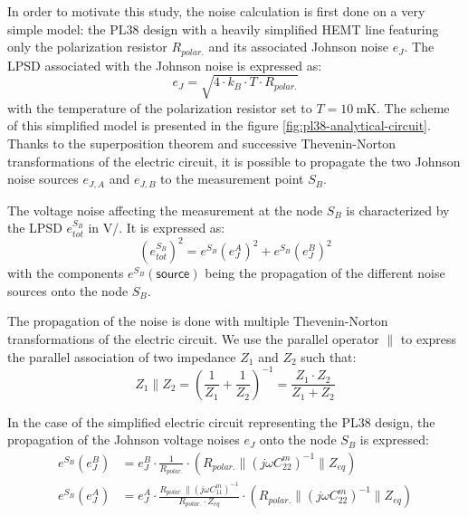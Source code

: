 In order to motivate this study, the noise calculation is first done on a very simple model: the PL38 design with a heavily simplified HEMT line featuring only the polarization resistor $R_{polar.}$ and its associated Johnson noise $e_J$. The LPSD associated with the Johnson noise is expressed as:
\begin{equation}
e_J = \sqrt{4 \cdot k_B \cdot T \cdot R_{polar.}}
\end{equation}
with the temperature of the polarization resistor set to $T=\SI{10}{\milli\kelvin}$. The scheme of this simplified model is presented in the figure \ref{fig:pl38-analytical-circuit}. Thanks to the superposition theorem and successive Thevenin-Norton transformations of the electric circuit, it is possible to propagate the two Johnson noise sources $e_{J,A}$ and $e_{J,B}$ to the measurement point $S_B$. 

The voltage noise affecting the measurement at the node $S_B$ is characterized by the LPSD $e_{tot}^{S_B}$ in \si[per-mode=symbol]{\volt\per\sqrthz}. It is expressed as:
\begin{equation}
\left( e_{tot}^{S_B} \right)^2
=
e^{S_B} \left( e_J^A \right)^2
+
e^{S_B} \left( e_J^B \right)^2
\end{equation}
with the components $e^{S_B} (\textsf{source})$ being the propagation of the different noise sources onto the node $S_B$.

The propagation of the noise is done with multiple Thevenin-Norton transformations of the electric circuit. We use the parallel operator $\parallel$ to express the parallel association of two impedance $Z_1$ and $Z_2$ such that:
\begin{equation}
Z_1 \parallel Z_2 = \left( \frac{1}{Z_1} + \frac{1}{Z_2} \right)^{-1} = \frac{Z_1 \cdot Z_2}{Z_1 + Z_2}
\end{equation}

In the case of the simplified electric circuit representing the PL38 design, the propagation of the Johnson voltage noises $e_J$ onto the node $S_B$ is expressed:
\begin{align}
e^{S_B} \left( e_J^B \right)
&=
e_J^B
\cdot 
\frac{1}{R_{polar.}}
\cdot
\left( R_{polar.} \parallel (j\omega C_{22}^m)^{-1} \parallel Z_{eq} \right)
\\
e^{S_B} \left( e_J^A \right)
&=
e_J^A
\cdot
\frac{R_{polar.} \parallel (j\omega C_{11}^m)^{-1} }{R_{polar.} \cdot Z_{eq}}
\cdot
\left( R_{polar.} \parallel (j\omega C_{22}^m)^{-1} \parallel Z_{eq} \right)
\end{align}

